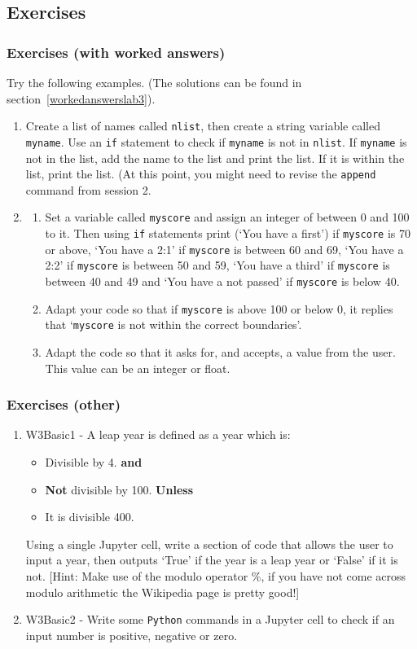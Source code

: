 \subsection{Exercises}
\subsubsection{Exercises (with worked answers)}
\label{ifexercises}
\noindent Try the following examples. (The solutions can be found in section~\ref{workedanswerslab3}).
\begin{enumerate}
\item Create a list of names called \texttt{nlist}, then create a string variable called \texttt{myname}. Use an \texttt{if} statement to check if \texttt{myname} is not in \texttt{nlist}. If \texttt{myname} is not in the list, add the name to the list and print the list. If it is within the list, print the list. (At this point, you might need to revise the {\tt append} command from session 2.
\item
\begin{enumerate}
\item Set a variable called {\tt myscore} and assign an integer of between 0 and 100 to it. Then using {\tt  if} statements print (`You have a first') if {\tt myscore} is 70 or above, `You have a 2:1' if {\tt myscore} is between 60 and 69, `You have a 2:2' if {\tt myscore} is between 50 and 59, `You have a third' if {\tt myscore} is between 40 and 49 and  `You have a not passed' if {\tt myscore} is below 40.
\item Adapt your code so that if {\tt myscore} is above 100 or below 0, it replies that `{\tt myscore} is not within the correct boundaries'.
\item Adapt the code so that it asks for, and accepts, a value from the user. This value can be an integer or float.
\end{enumerate}
\end{enumerate}

\subsubsection{Exercises (other)}
\begin{enumerate}
    \item W3Basic1 - A leap year is defined as a year which is:
    \begin{itemize}
        \item Divisible by 4. \textbf{and}
        \item \textbf{Not} divisible by 100. \textbf{Unless} 
        \item It is divisible 400.
    \end{itemize}
    Using a single Jupyter cell, write a section of code that allows the user to input a year, then outputs `True' if the year is a leap year or `False' if it is not. [Hint: Make use of the modulo operator \%, if you have not come across modulo arithmetic the Wikipedia page is pretty good!]
    \item W3Basic2 - Write some \texttt{Python} commands in a Jupyter cell to check if an input number is positive, negative or zero.
\end{enumerate}

